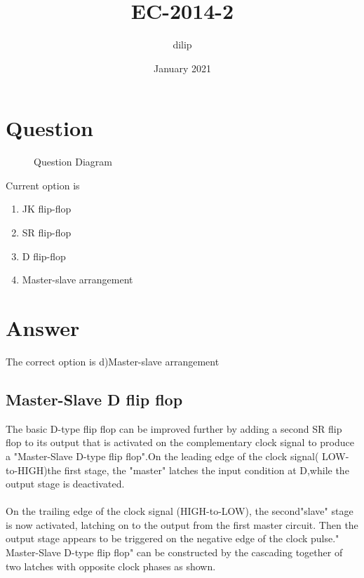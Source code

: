 \documentclass{article}
\title{EC-2014-2}
\author{dilip}
\date{January 2021}
\begin{document}
\maketitle

\section{Question}

\begin{figure}[h]
    \centering
    \scalebox{0.65}{
    }
    \caption{Question Diagram}
    \label{fig:my_label}
\end{figure}

Current option is

\begin{enumerate}[label=(\alph*)]
    \item JK flip-flop
    \item SR flip-flop
    \item D flip-flop
    \item Master-slave arrangement
\end{enumerate}

\section{Answer} 
 The correct option is d)Master-slave arrangement
 \subsection{Master-Slave D flip flop}
  The basic D-type flip flop can be improved further by adding a second SR flip flop to its output that is activated on the complementary clock signal to produce a "Master-Slave D-type flip flop".On the leading edge of the clock signal( LOW-to-HIGH)the first stage, the "master" latches the input condition at D,while the output stage is deactivated.
  \paragraph{}
  On the trailing edge of the clock signal (HIGH-to-LOW), the second"slave" stage is now activated, latching on to the output from the first master circuit. Then the output stage appears to be triggered on the negative edge of the clock pulse." Master-Slave D-type flip flop" can be constructed by the cascading together of two latches with opposite clock phases as shown.
\begin{figure}[h]
\centering
{}
\end{figure}
\end{document}
